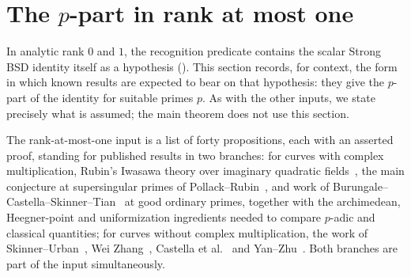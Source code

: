 \section{The \texorpdfstring{$p$}{p}-part in rank at most one}
\label{sec:t-cascade}

In analytic rank $0$ and $1$, the recognition predicate contains the
scalar Strong BSD identity itself as a hypothesis
().  This section records, for context, the
form in which known results are expected to bear on that hypothesis: they
give the $p$-part of the identity for suitable primes $p$.  As with the
other inputs, we state precisely what is assumed; the main theorem does not
use this section.

\begin{definition}\label{def:closure:t-cascade-import}
The rank-at-most-one input is a list of forty propositions, each with an
asserted proof, standing for published results in two branches: for curves
with complex multiplication, Rubin's Iwasawa theory over imaginary
quadratic fields~\citep{Rubin1991}, the main conjecture at supersingular
primes of Pollack--Rubin~\citep[Theorem~7.3]{PollackRubin2004}, and work of
Burungale--Castella--Skinner--Tian~\citep{BurungaleCastellaSkinnerTian2022}
at good ordinary primes, together with the archimedean, Heegner-point and
uniformization ingredients needed to compare $p$-adic and classical
quantities; for curves without complex multiplication, the work of
Skinner--Urban~\citep{SkinnerUrban2014}, Wei Zhang~\citep{WeiZhang2014},
Castella et al.~\citep{CHKLL2025} and Yan--Zhu~\citep{YanZhu2026}.  Both
branches are part of the input simultaneously.
\end{definition}

